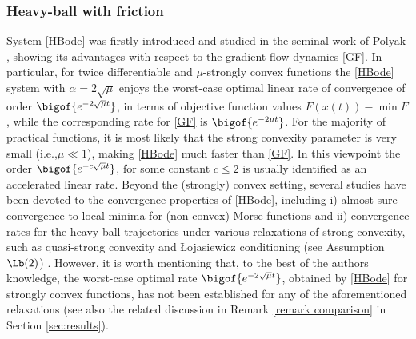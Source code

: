 \documentclass[reqno]{amsart}
\theoremstyle{plain}
\theoremstyle{definition}
\theoremstyle{remark}
\newcommand{\ie}{i.e.,\xspace}	%
\begin{document}
\subsubsection{Heavy-ball with friction}
System \eqref{HBode} was firstly introduced and studied in the seminal work of Polyak \cite{polyak1964some}, showing its advantages with respect to the gradient flow dynamics \eqref{GF}. 
In particular, for twice differentiable and $\mu$-strongly convex functions the \eqref{HBode} system with $\alpha=2\sqrt{\mu}$ enjoys the worst-case optimal linear rate of convergence of order $\bigof{e^{-2\sqrt{\mu}t}}$, in terms of objective function values $F(x(t)) - \min F$, while the corresponding rate for \eqref{GF} is $\bigof{e^{-2\mu t}}$. For the majority of practical functions, it is most likely that the strong convexity parameter is very small (\ie $\mu \ll 1$), making \eqref{HBode} much faster than \eqref{GF}. In this viewpoint the order $\bigof{e^{-c\sqrt{\mu}t}}$, for some constant $c\leq 2$ is usually identified as an accelerated linear rate. Beyond the (strongly) convex setting, several studies have been devoted to the convergence properties of \eqref{HBode}, including i) almost sure convergence to local minima for (non convex) Morse functions \cite{attouch2000heavy,goudou2009gradient}  and ii) convergence rates for the heavy ball trajectories under various relaxations of strong convexity, such as quasi-strong convexity \cite{siegel2019accelerated,aujol2022convergencequasi,aujol2024heavy,aujol2023convergencePL} and  \L ojasiewicz conditioning (see Assumption \hyperref[PL]{$\Lb(2)$}) \cite{haraux1998convergence,begout2015damped,polyak2017lyapunov,apidopoulos2022convergence}. However, it is worth mentioning that, to the best of the authors knowledge, the worst-case optimal rate $\bigof{e^{-2\sqrt{\mu}t}}$, obtained by \eqref{HBode} for strongly convex functions, has not been established for any of the aforementioned relaxations (see also the related discussion in Remark \ref{remark comparison} in Section \ref{sec:results}).
\end{document}
